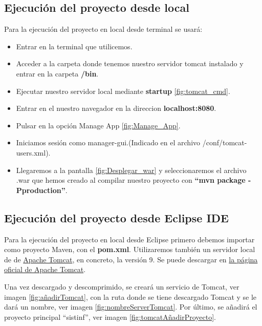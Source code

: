 \subsection{Ejecución del proyecto desde local}

Para la ejecución del proyecto en local desde terminal se usará:
\begin{itemize}
	\item Entrar en la terminal que utilicemos.
	\item Acceder a la carpeta donde tenemos nuestro servidor tomcat instalado y entrar en la carpeta \textbf{/bin}.
	\item Ejecutar nuestro servidor local mediante \textbf{startup} \ref{fig:tomcat_cmd}.  
	\item Entrar en el nuestro navegador en la direccion \textbf{localhost:8080}.
	\item Pulsar en la opción Manage App \ref{fig:Manage_App}.
	\item Iniciamos sesión como manager-gui.(Indicado en el archivo /conf/tomcat-users.xml).
	\item Llegaremos a la pantalla \ref{fig:Desplegar_war} y seleccionaremos el archivo .war que hemos creado al compilar nuestro proyecto con \textbf{``mvn package -Pproduction''}.
	
	
	
	
\end{itemize}

\subsection{Ejecución del proyecto desde Eclipse IDE}

Para la ejecución del proyecto en local desde Eclipse primero debemos importar como proyecto Maven, con el \textbf{pom.xml}. Utilizaremos también un servidor local de de \href{https://tomcat.apache.org/i}{Apache Tomcat}, en concreto, la versión 9. Se puede descargar en \href{https://tomcat.apache.org/download-90.cgi}{la página oficial de Apache Tomcat}.


Una vez descargado y descomprimido, se creará un servicio de Tomcat, ver imagen \ref{fig:añadirTomcat}, con la ruta donde se tiene descargado Tomcat y se le dará un nombre, ver imagen \ref{fig:nombreServerTomcat}. Por último, se añadirá el proyecto principal ``sistinf'', ver imagen \ref{fig:tomcatAñadirProyecto}.

